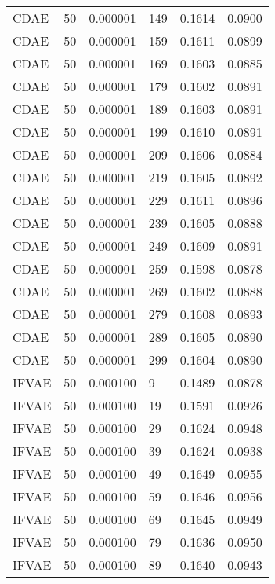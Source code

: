 \begin{tabular}{llrlrr}
    CDAE &   50 &  0.000001 &   149 &  0.1614 &       0.0900 \\
    CDAE &   50 &  0.000001 &   159 &  0.1611 &       0.0899 \\
    CDAE &   50 &  0.000001 &   169 &  0.1603 &       0.0885 \\
    CDAE &   50 &  0.000001 &   179 &  0.1602 &       0.0891 \\
    CDAE &   50 &  0.000001 &   189 &  0.1603 &       0.0891 \\
    CDAE &   50 &  0.000001 &   199 &  0.1610 &       0.0891 \\
    CDAE &   50 &  0.000001 &   209 &  0.1606 &       0.0884 \\
    CDAE &   50 &  0.000001 &   219 &  0.1605 &       0.0892 \\
    CDAE &   50 &  0.000001 &   229 &  0.1611 &       0.0896 \\
    CDAE &   50 &  0.000001 &   239 &  0.1605 &       0.0888 \\
    CDAE &   50 &  0.000001 &   249 &  0.1609 &       0.0891 \\
    CDAE &   50 &  0.000001 &   259 &  0.1598 &       0.0878 \\
    CDAE &   50 &  0.000001 &   269 &  0.1602 &       0.0888 \\
    CDAE &   50 &  0.000001 &   279 &  0.1608 &       0.0893 \\
    CDAE &   50 &  0.000001 &   289 &  0.1605 &       0.0890 \\
    CDAE &   50 &  0.000001 &   299 &  0.1604 &       0.0890 \\
   IFVAE &   50 &  0.000100 &     9 &  0.1489 &       0.0878 \\
   IFVAE &   50 &  0.000100 &    19 &  0.1591 &       0.0926 \\
   IFVAE &   50 &  0.000100 &    29 &  0.1624 &       0.0948 \\
   IFVAE &   50 &  0.000100 &    39 &  0.1624 &       0.0938 \\
   IFVAE &   50 &  0.000100 &    49 &  0.1649 &       0.0955 \\
   IFVAE &   50 &  0.000100 &    59 &  0.1646 &       0.0956 \\
   IFVAE &   50 &  0.000100 &    69 &  0.1645 &       0.0949 \\
   IFVAE &   50 &  0.000100 &    79 &  0.1636 &       0.0950 \\
   IFVAE &   50 &  0.000100 &    89 &  0.1640 &       0.0943 \\

\end{tabular}
